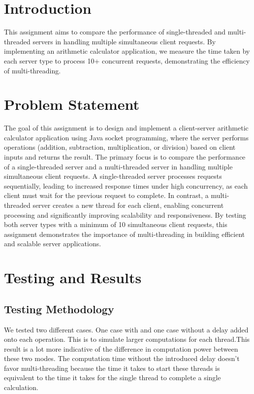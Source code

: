 \documentclass{article}
\begin{document}
\section{\textbf{Introduction}}

This assignment aims to compare the performance of single-threaded and multi-threaded servers in handling multiple simultaneous client requests. By implementing an arithmetic calculator application, we measure the time taken by each server type to process 10+ concurrent requests, demonstrating the efficiency of multi-threading. 

\section{\textbf{Problem Statement}}

The goal of this assignment is to design and implement a client-server arithmetic calculator application using Java socket programming, where the server performs operations (addition, subtraction, multiplication, or division) based on client inputs and returns the result. The primary focus is to compare the performance of a single-threaded server and a multi-threaded server in handling multiple simultaneous client requests. A single-threaded server processes requests sequentially, leading to increased response times under high concurrency, as each client must wait for the previous request to complete. In contrast, a multi-threaded server creates a new thread for each client, enabling concurrent processing and significantly improving scalability and responsiveness. By testing both server types with a minimum of 10 simultaneous client requests, this assignment demonstrates the importance of multi-threading in building efficient and scalable server applications.

\section{\textbf{Testing and Results}}

\subsection{\textbf{Testing Methodology}}

We tested two different cases. One case with and one case without a delay added onto each operation. This is to simulate larger computations for each thread.This result is a lot more indicative of the difference in computation power between these two modes. The computation time without the introduced delay doesn't favor multi-threading because the time it takes to start these threads is equivalent to the time it takes for the single thread to complete a single calculation.
\end{document}
